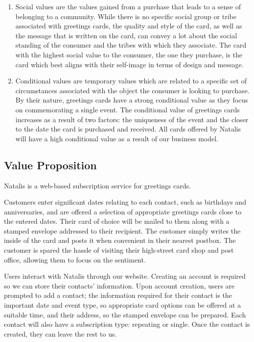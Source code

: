 \documentclass[10pt,a4paper]{article}
\begin{document}
\begin{enumerate}
  \item Social values are the values gained from a purchase that leads to a sense of belonging to a community. While there is no specific social group or tribe \citep{canniford2011manage} associated with greetings cards, the quality and style of the card, as well as the message that is written on the card, can convey a lot about the social standing of the consumer and the tribes with which they associate. The card with the highest social value to the consumer, the one they purchase, is the card which best aligns with their self-image in terms of design and message.
  \item Conditional values are temporary values which are related to a specific set of circumstances associated with the object the consumer is looking to purchase. By their nature, greetings cards have a strong conditional value as they focus on commemorating a single event. The conditional value of greetings cards increases as a result of two factors: the uniqueness of the event and the closer to the date the card is purchased and received. All cards offered by Natalis will have a high conditional value as a result of our business model.
\end{enumerate}

\subsection*{Value Proposition}
Natalis is a web-based subscription service for greetings cards.

Customers enter significant dates relating to each contact, such as birthdays and anniversaries, and are offered a selection of appropriate greetings cards close to the entered dates. Their card of choice will be mailed to them along with a stamped envelope addressed to their recipient. The customer simply writes the inside of the card and posts it when convenient in their nearest postbox. The customer is spared the hassle of visiting their high-street card shop and post office, allowing them to focus on the sentiment.

Users interact with Natalis through our website. Creating an account is required so we can store their contacts' information. Upon account creation, users are prompted to add a contact; the information required for their contact is the important date and event type, so appropriate card options can be offered at a suitable time, and their address, so the stamped envelope can be prepared. Each contact will also have a subscription type: repeating or single. Once the contact is created, they can leave the rest to us.
\end{document}
